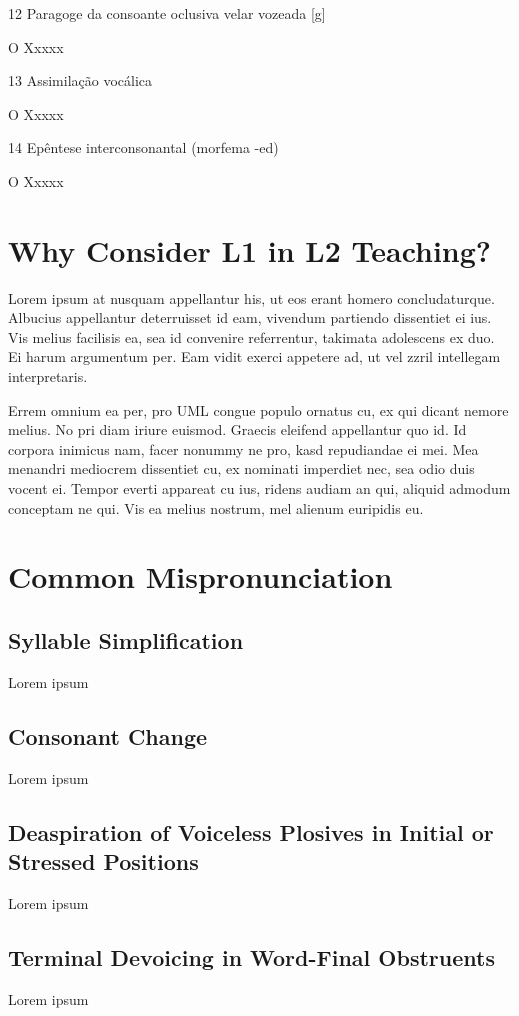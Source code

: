 12 Paragoge da consoante oclusiva velar vozeada {[}g{]}

O Xxxxx

13 Assimila\c{c}\~ao voc\'alica

O Xxxxx

14 Ep\^entese interconsonantal (morfema -ed)

O Xxxxx


\section{Why Consider L1 in L2 Teaching?}

Lorem ipsum at nusquam appellantur his, ut eos erant homero
concludaturque. Albucius appellantur deterruisset id eam, vivendum
partiendo dissentiet ei ius. Vis melius facilisis ea, sea id convenire
referrentur, takimata adolescens ex duo. Ei harum argumentum per. Eam
vidit exerci appetere ad, ut vel zzril intellegam interpretaris.

Errem omnium ea per, pro \ac{UML} congue populo ornatus cu, ex qui
dicant nemore melius. No pri diam iriure euismod. Graecis eleifend
appellantur quo id. Id corpora inimicus nam, facer nonummy ne pro,
kasd repudiandae ei mei. Mea menandri mediocrem dissentiet cu, ex
nominati imperdiet nec, sea odio duis vocent ei. Tempor everti
appareat cu ius, ridens audiam an qui, aliquid admodum conceptam ne
qui. Vis ea melius nostrum, mel alienum euripidis eu.

\section{Common Mispronunciation}\label{sec:common-mispronunciation}

\subsection{Syllable Simplification}
Lorem ipsum

\subsection{Consonant Change}
Lorem ipsum

\subsection{Deaspiration of Voiceless Plosives in Initial or Stressed Positions}
Lorem ipsum

\subsection{Terminal Devoicing in Word-Final Obstruents}
Lorem ipsum

